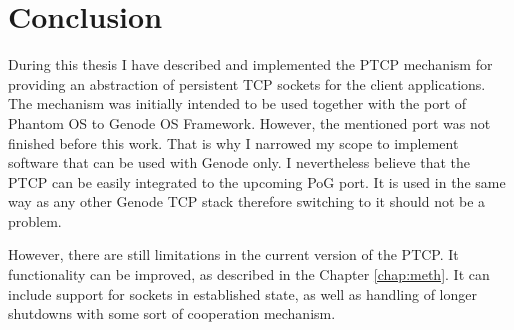 \chapter{Conclusion}
\label{chap:conclusion}

During this thesis I have described and implemented the PTCP mechanism for
providing an abstraction of persistent TCP sockets for the client applications.
The mechanism was initially intended to be used together with the port of
Phantom OS to Genode OS Framework. However, the mentioned port was not finished
before this work. That is why I narrowed my scope to implement software that
can be used with Genode only. I nevertheless believe that the PTCP can be
easily integrated to the upcoming PoG port. It is used in the same way as any
other Genode TCP stack therefore switching to it should not be a problem.

However, there are still limitations in the current version of the PTCP. It
functionality can be improved, as described in the Chapter \ref{chap:meth}. It
can include support for sockets in established state, as well as handling of
longer shutdowns with some sort of cooperation mechanism.
